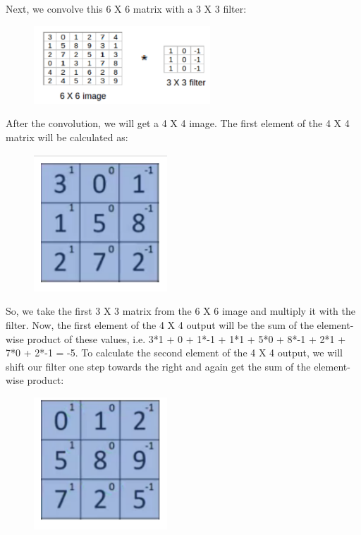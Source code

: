 \documentclass[a4paper]{article}
\begin{document}
Next, we convolve this 6 X 6 matrix with a 3 X 3 filter: 
{
\begin{figure}[htp]
    \centering
    \includegraphics[width=250]{matrix.png}
\end{figure}
}

\clearpage

After the convolution, we will get a 4 X 4 image. The first element of the 4 X 4 matrix will be calculated as:

{
\begin{figure}[htp]
    \centering
    \includegraphics[width=5cm]{3x3_matrix.png}
\end{figure}
}

So, we take the first 3 X 3 matrix from the 6 X 6 image and multiply it with the filter. Now, the first element of the 4 X 4 output will be the sum of the element-wise product of these values, i.e. 3*1 + 0 + 1*-1 + 1*1 + 5*0 + 8*-1 + 2*1 + 7*0 + 2*-1 = -5. To calculate the second element of the 4 X 4 output, we will shift our filter one step towards the right and again get the sum of the element-wise product:

{
\begin{figure}[htp]
    \centering
    \includegraphics[width=5cm]{F_3x3_matrix.png}
\end{figure}
}
\end{document}

